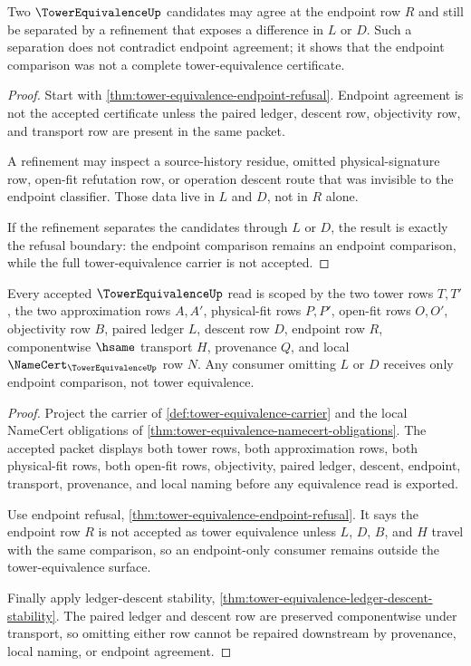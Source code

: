 \begin{theorem}
\label{thm:tower-equivalence-refinement-separation}
Two $\TowerEquivalenceUp$ candidates may agree at the endpoint row $R$ and still be separated by a refinement that exposes a difference in $L$ or $D$. Such a separation does not contradict endpoint agreement; it shows that the endpoint comparison was not a complete tower-equivalence certificate.
\end{theorem}
\begin{proof}
Start with \autoref{thm:tower-equivalence-endpoint-refusal}. Endpoint agreement is not the accepted certificate unless the paired ledger, descent row, objectivity row, and transport row are present in the same packet.

A refinement may inspect a source-history residue, omitted physical-signature row, open-fit refutation row, or operation descent route that was invisible to the endpoint classifier. Those data live in $L$ and $D$, not in $R$ alone.

If the refinement separates the candidates through $L$ or $D$, the result is exactly the refusal boundary: the endpoint comparison remains an endpoint comparison, while the full tower-equivalence carrier is not accepted.
\end{proof}

\begin{theorem}
\label{thm:tower-equivalence-obligation-scope}
Every accepted $\TowerEquivalenceUp$ read is scoped by the two tower rows $T,T'$, the two approximation rows $A,A'$, physical-fit rows $P,P'$, open-fit rows $O,O'$, objectivity row $B$, paired ledger $L$, descent row $D$, endpoint row $R$, componentwise $\hsame$ transport $H$, provenance $Q$, and local $\NameCert_{\TowerEquivalenceUp}$ row $N$. Any consumer omitting $L$ or $D$ receives only endpoint comparison, not tower equivalence.
\end{theorem}
\begin{proof}
Project the carrier of \autoref{def:tower-equivalence-carrier} and the local NameCert obligations of \autoref{thm:tower-equivalence-namecert-obligations}. The accepted packet displays both tower rows, both approximation rows, both physical-fit rows, both open-fit rows, objectivity, paired ledger, descent, endpoint, transport, provenance, and local naming before any equivalence read is exported.

Use endpoint refusal, \autoref{thm:tower-equivalence-endpoint-refusal}. It says the endpoint row $R$ is not accepted as tower equivalence unless $L$, $D$, $B$, and $H$ travel with the same comparison, so an endpoint-only consumer remains outside the tower-equivalence surface.

Finally apply ledger-descent stability, \autoref{thm:tower-equivalence-ledger-descent-stability}. The paired ledger and descent row are preserved componentwise under transport, so omitting either row cannot be repaired downstream by provenance, local naming, or endpoint agreement.
\end{proof}

